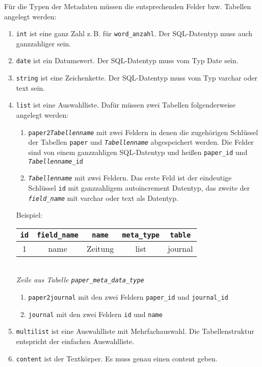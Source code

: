 \documentclass[11pt]{scrartcl} %
\begin{document}
F\"ur die Typen der Metadaten m\"ussen die entsprechenden Felder bzw. Tabellen angelegt werden:

\begin{enumerate}
\item \texttt{int} ist eine ganz Zahl z.\,B. f\"ur \texttt{word\_anzahl}. Der SQL-Datentyp muss auch  ganzzahliger sein.
\item \texttt{date} ist ein Datumswert. Der SQL-Datentyp muss vom Typ Date sein.
\item \texttt{string} ist eine Zeichenkette. Der SQL-Datentyp muss vom Typ varchar oder text sein.
\item \texttt{list} ist eine Auswahlliste. Daf\"ur m\"ussen zwei Tabellen folgenderweise angelegt werden:
\begin{enumerate}
	\item \texttt{paper2\emph{Tabellenname}} mit zwei Feldern in denen die zugeh\"origen Schl\"ussel der Tabellen \texttt{paper} und \texttt{\emph{Tabellenname}} abgespeichert werden. Die Felder sind von einem ganzzahligen SQL-Datentyp und hei{\ss}en  \texttt{paper\_id} und \texttt{\emph{Tabellenname}\_id}
	\item \texttt{\emph{Tabellenname}} mit zwei Feldern. Das erste Feld ist der eindeutige Schl\"ussel \texttt{id} mit ganzzahligem autoincrement Datentyp, das zweite der \texttt{\emph{field\_name}} mit varchar oder text als Datentyp.
\end{enumerate}
Beispiel: \\
\begin{center}
\begin{tabular}[t]{ccccc}
\hline
  \texttt{id} & \texttt{field\_name} & \texttt{name} & \texttt{meta\_type} & \texttt{table} \\
  \hline
  1 & name & Zeitung & list & journal \\
  \hline
\end{tabular} \\
\emph{Zeile aus Tabelle \texttt{paper\_meta\_data\_type}}
\end{center}

\begin{enumerate}
	\item  \texttt{paper2journal} mit den zwei Feldern	\texttt{paper\_id} und \texttt{journal\_id}
	\item  \texttt{journal} mit den zwei Feldern \texttt{id} und \texttt{name}
\end{enumerate}
\item \texttt{multilist} ist eine Auswahlliste mit Mehrfachauswahl. Die Tabellenstruktur entspricht der einfachen Auswahlliste.
\item \texttt{content} ist der Textk\"orper. Es muss genau einen content geben.
\end{enumerate}
\end{document}
